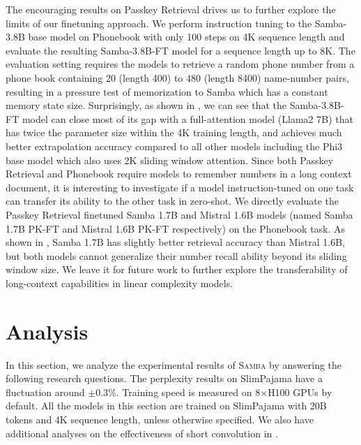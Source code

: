 \documentclass{article}
\begin{document}
The encouraging results on Passkey Retrieval drives us to further explore the limits of our finetuning approach. We perform instruction tuning to the Samba-3.8B base model on Phonebook \citep{jelassi2024repeat} with only 100 steps on 4K sequence length and evaluate the resulting Samba-3.8B-FT model for a sequence length up to 8K. The evaluation setting requires the models to retrieve a random phone number from a phone book containing 20 (length 400) to 480 (length 8400) name-number pairs, resulting in a pressure test of memorization to Samba which has a constant memory state size.
Surprisingly, as shown in , we can see that the Samba-3.8B-FT model can close most of its gap with a full-attention model (Llama2 7B) that has twice the parameter size within the 4K training length, and achieves much better extrapolation accuracy compared to all other models including the Phi3 base model which also uses 2K sliding window attention. Since both Passkey Retrieval and Phonebook require models to remember numbers in a long context document, it is interesting to investigate if a model instruction-tuned on one task can transfer its ability to the other task in zero-shot. We directly evaluate the Passkey Retrieval finetuned Samba 1.7B and Mistral 1.6B models (named Samba 1.7B PK-FT and Mistral 1.6B PK-FT respectively) on the Phonebook task. As shown in , Samba 1.7B has slightly better retrieval accuracy than Mistral 1.6B, but both models cannot generalize their number recall ability beyond its sliding window size. We leave it for future work to further explore the transferability of long-context capabilities in linear complexity models. 





\section{Analysis} \label{ana}




In this section, we analyze the experimental results of \textsc{Samba} by answering the following research questions. The perplexity results
on SlimPajama have a fluctuation around $\pm 0.3\%$. Training speed is measured on 8$\times$H100 GPUs by default. All the models in this section are trained on SlimPajama with 20B tokens and 4K sequence length, unless otherwise specified. We also have additional analyses on the effectiveness of short convolution in .
\end{document}
